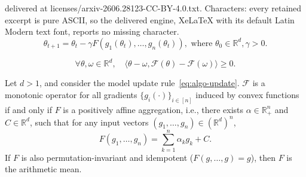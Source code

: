 \documentclass[10pt,a4paper]{amsart}
\newcommand\mb{\mathbb}
\newcommand{\F}{\mathcal{F}}
\newcommand{\R}{\mathbb{R}}
\begin{document}
delivered at licenses/arxiv-2606.28123-CC-BY-4.0.txt. Characters: every retained excerpt is pure ASCII, so the delivered engine, XeLaTeX with its default Latin Modern text font, reports no missing character.
\begin{equation}\label{eq:algo-update}
    \theta_{t+1} = \theta_t - \gamma F(g_1(\theta_t), \ldots, g_n(\theta_t)), \text{ where } \theta_0 \in \R^d, \gamma > 0.
\end{equation}

\begin{equation}\label{eq:operator-convexity}
    \forall \theta, \omega \in \R^d,\quad \langle \theta - \omega, \F(\theta) - \F(\omega) \rangle \geq 0.
\end{equation}

\begin{theorem}\label{thm:universal_convexity}
    Let $d>1$, and consider the model update rule~\eqref{eq:algo-update}. 
    $\F$ is a monotonic operator for all gradients $\{g_i(\cdot)\}_{i\in[n]}$ induced by convex functions
    if and only if $F$ is a positively affine aggregation, i.e., there exists $\alpha \in \mb{R}_+^n$ and $C \in \mb{R}^d$, such that for any input vectors $(g_1, \ldots, g_n) \in (\mb{R}^d)^n$,
    \[
        F(g_1, \ldots, g_n) = \sum_{k=1}^n \alpha_k g_k + C.
    \]
    If $F$ is also permutation-invariant and idempotent ($F(g, \ldots,g)\! =\! g$), then $F$ is the arithmetic mean.%
\end{theorem}
\end{document}
